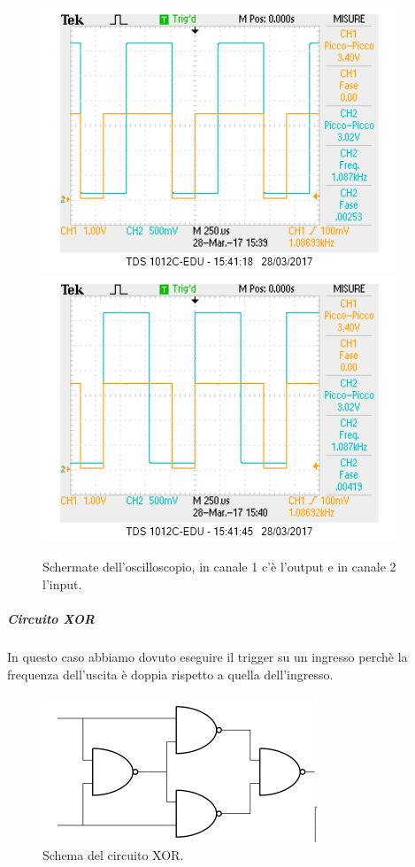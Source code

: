 \documentclass[10pt,a4paper]{article}
\begin{document}
\begin{figure}[!htb]
  \centering
  \includegraphics[scale=0.75]{or1.png}\includegraphics[scale=0.75]{or2.png}
\caption{Schermate dell'oscilloscopio, in canale 1 c'è l'output e in canale 2 l'input.\label{osc:OR}}
\end{figure}

\subparagraph{Circuito XOR}
In questo caso abbiamo dovuto eseguire il trigger su un ingresso perchè la frequenza dell'uscita è doppia rispetto a quella dell'ingresso.


\begin{figure}[!htb]
  \centering
  \includegraphics[scale=0.5]{xor.png}
\caption{Schema del circuito XOR.\label{fig:XOR}}
\end{figure}
\end{document}
